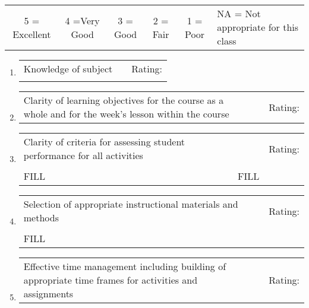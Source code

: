 \documentclass[11pt,dvipsnames]{article}
\begin{document}

{\tabulinesep=1.2mm
	\begin{tabu}{c  c c c c p{4cm} }
		
		5 = Excellent   & 4 =Very Good & 3 = Good & 2 = Fair & 1 = Poor & NA = Not appropriate for this class  \\ 	
	\end{tabu}}
\vskip 0.5cm

\begin{enumerate}[label= {\bf  \arabic*:}]
	\item
	\begin{tabular}[t]{p{} p{3cm} p{2cm} }
		Knowledge of subject & & Rating: \\
		& & \\
	\end{tabular} 
	
	
	\item 	\begin{tabular}[t]{p{}  p{3cm} p{3cm} }
		Clarity of learning objectives for the course as a whole and for the week's lesson within the course & & Rating: 
	\end{tabular} 
	\item 	\begin{tabular}[t]{p{}  p{3cm} p{3cm} }
		Clarity of criteria for assessing student performance for all activities & & Rating: \\
		& & \\
		FILL & FILL & \\
		\end{tabular} 
    \item 	\begin{tabular}[t]{p{}  p{3cm} p{3cm} }
	Selection of appropriate instructional materials and methods & & Rating: \\
	& &\\
	FILL & &\\
\end{tabular} 
\item 	\begin{tabular}[t]{p{}  p{3cm} p{3cm} }
	Effective time management including building of appropriate
	time frames for activities and assignments & & Rating: \\
	

\end{tabular}
\end{enumerate}
\end{document}
